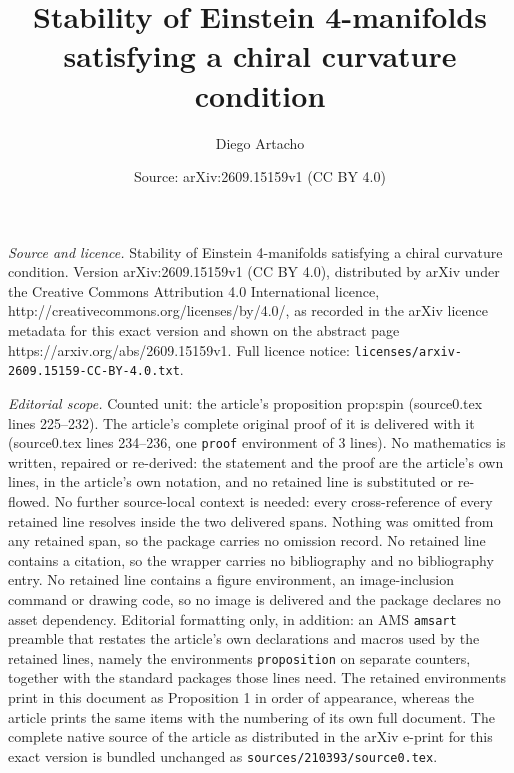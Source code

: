 \documentclass[10pt,a4paper]{amsart}
\title{Stability of Einstein 4-manifolds satisfying a chiral curvature condition}
\author{Diego Artacho}
\date{Source: arXiv:2609.15159v1 (CC BY 4.0)}
\begin{document}
\maketitle

\noindent\emph{Source and licence.} Stability of Einstein 4-manifolds satisfying a chiral curvature condition. Version arXiv:2609.15159v1 (CC BY 4.0), distributed by arXiv under the Creative Commons Attribution 4.0 International licence, http://creativecommons.org/licenses/by/4.0/, as recorded in the arXiv licence metadata for this exact version and shown on the abstract page https://arxiv.org/abs/2609.15159v1. Full licence notice: \texttt{licenses/arxiv-2609.15159-CC-BY-4.0.txt}.\par\smallskip

\noindent\textit{Editorial scope.} Counted unit: the article's proposition prop:spin (source0.tex lines 225--232). The article's complete original proof of it is delivered with it (source0.tex lines 234--236, one \texttt{proof} environment of 3 lines). No mathematics is written, repaired or re-derived: the statement and the proof are the article's own lines, in the article's own notation, and no retained line is substituted or re-flowed.  No further source-local context is needed: every cross-reference of every retained line resolves inside the two delivered spans.  Nothing was omitted from any retained span, so the package carries no omission record.  No retained line contains a citation, so the wrapper carries no bibliography and no bibliography entry.  No retained line contains a figure environment, an image-inclusion command or drawing code, so no image is delivered and the package declares no asset dependency.  Editorial formatting only, in addition: an AMS \texttt{amsart} preamble that restates the article's own declarations and macros used by the retained lines, namely the environments \texttt{proposition} on separate counters, together with the standard packages those lines need.  The retained environments print in this document as Proposition 1 in order of appearance, whereas the article prints the same items with the numbering of its own full document.  The complete native source of the article as distributed in the arXiv e-print for this exact version is bundled unchanged as \texttt{sources/210393/source0.tex}.
\end{document}
